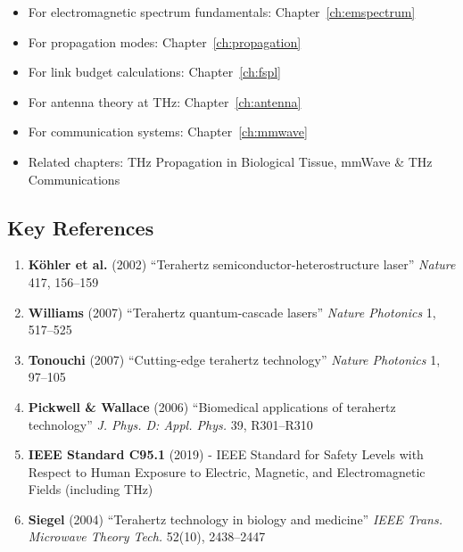 \begin{itemize}
\item For electromagnetic spectrum fundamentals: Chapter~\ref{ch:emspectrum}
\item For propagation modes: Chapter~\ref{ch:propagation}
\item For link budget calculations: Chapter~\ref{ch:fspl}
\item For antenna theory at THz: Chapter~\ref{ch:antenna}
\item For communication systems: Chapter~\ref{ch:mmwave}
\item Related chapters: THz Propagation in Biological Tissue, mmWave \& THz Communications
\end{itemize}

\subsection*{Key References}

\begin{enumerate}
\item \textbf{Köhler et al.} (2002) ``Terahertz semiconductor-heterostructure laser'' \emph{Nature} 417, 156--159
\item \textbf{Williams} (2007) ``Terahertz quantum-cascade lasers'' \emph{Nature Photonics} 1, 517--525
\item \textbf{Tonouchi} (2007) ``Cutting-edge terahertz technology'' \emph{Nature Photonics} 1, 97--105
\item \textbf{Pickwell \& Wallace} (2006) ``Biomedical applications of terahertz technology'' \emph{J. Phys. D: Appl. Phys.} 39, R301--R310
\item \textbf{IEEE Standard C95.1} (2019) - IEEE Standard for Safety Levels with Respect to Human Exposure to Electric, Magnetic, and Electromagnetic Fields (including THz)
\item \textbf{Siegel} (2004) ``Terahertz technology in biology and medicine'' \emph{IEEE Trans. Microwave Theory Tech.} 52(10), 2438--2447
\end{enumerate}

